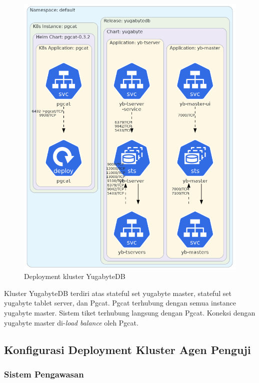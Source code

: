 \begin{figure}[htbp]
    \centering
    \includegraphics[width=1\textwidth]{resources/chapter-4/yugabyte.png}
    \caption{Deployment kluster YugabyteDB}
    \label{fig:deployment-yugabyte}
\end{figure}

Kluster YugabyteDB terdiri atas stateful set yugabyte master, stateful set yugabyte tablet server, dan Pgcat. Pgcat terhubung dengan semua instance yugabyte master. Sistem tiket terhubung langsung dengan Pgcat. Koneksi dengan yugabyte master di-\textit{load balance} oleh Pgcat.

\pagebreak

\subsection{Konfigurasi Deployment Kluster Agen Penguji}

\subsubsection{Sistem Pengawasan}

